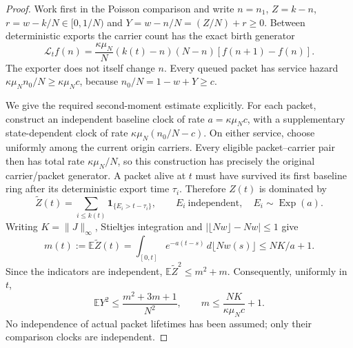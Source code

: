\documentclass[11pt,a4paper]{article}
\theoremstyle{definition}
\theoremstyle{remark}\newtheorem{remark}[theorem]{Remark}
\begin{document}
\begin{proof}
Work first in the Poisson comparison and write $n=n_1$, $Z=k-n$, $r=w-k/N\in[0,1/N)$ and $Y=w-n/N=(Z/N)+r\ge0$. Between deterministic exports the carrier count has the exact birth generator
\begin{equation}\label{pil:generator}
 \mathcal L_t f(n)=\frac{\kappa\mu_N}{N}(k(t)-n)(N-n)[f(n+1)-f(n)].
\end{equation}
The exporter does not itself change $n$. Every queued packet has service hazard $\kappa\mu_N n_0/N\ge\kappa\mu_N c$, because $n_0/N=1-w+Y\ge c$.

We give the required second-moment estimate explicitly. For each packet, construct an independent baseline clock of rate $a=\kappa\mu_Nc$, with a supplementary state-dependent clock of rate $\kappa\mu_N(n_0/N-c)$. On either service, choose uniformly among the current origin carriers. Every eligible packet--carrier pair then has total rate $\kappa\mu_N/N$, so this construction has precisely the original carrier/packet generator. A packet alive at $t$ must have survived its first baseline ring after its deterministic export time $\tau_i$. Therefore $Z(t)$ is dominated by
\[
 \widetilde Z(t)=\sum_{i\le k(t)}\mathbf1_{\{E_i>t-\tau_i\}},
 \qquad E_i\ {\text{independent}},\quad E_i\sim\operatorname{Exp}(a).
\]
Writing $K=\|J\|_\infty$, Stieltjes integration and $|\lfloor Nw\rfloor-Nw|\le1$ give
\[
 m(t):=\mathbb E\widetilde Z(t)
 =\int_{[0,t]} e^{-a(t-s)}\,d\lfloor Nw(s)\rfloor
 \le NK/a+1.
\]
Since the indicators are independent, $\mathbb E\widetilde Z^2\le m^2+m$. Consequently, uniformly in $t$,
\begin{equation}\label{pil:secondmoment}
 \mathbb E Y^2\le\frac{m^2+3m+1}{N^2},\qquad
 m\le\frac{NK}{\kappa\mu_Nc}+1.
\end{equation}
No independence of actual packet lifetimes has been assumed; only their comparison clocks are independent.


\end{proof}
\end{document}
